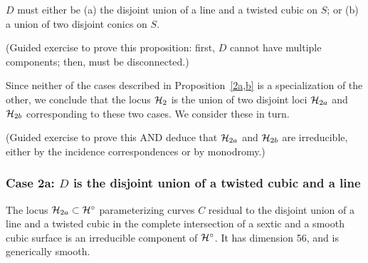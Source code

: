 \begin{proposition}\label {2a,b}
$D$ must either be (a) the disjoint union of a line and a twisted cubic on $S$; or (b) a union of two disjoint conics on $S$. 
\end{proposition}

\begin{exercise}\label{character of D}
(Guided exercise to prove this proposition: first, $D$ cannot have multiple components; then, must be disconnected.)
\end{exercise}

Since neither of the cases described in Proposition~\ref{2a,b} is a specialization of the other, we conclude that the locus ${\cal H}_2$ is the union of two disjoint loci ${\cal H}_{2a}$ and ${\cal H}_{2b}$ corresponding to these two cases. We consider these in turn.


\begin{exercise}
(Guided exercise to prove this AND deduce that ${\cal H}_{2a}$ and ${\cal H}_{2b}$ are irreducible, either by the incidence correspondences or by monodromy.)
\end{exercise}


\subsubsection{Case 2a: $D$ is the disjoint union of a twisted cubic and a line}

\begin{proposition}
The locus ${\cal H}_{2a} \subset {\cal H}^\circ$ parameterizing curves $C$ residual to the disjoint union of a line and a twisted cubic  in the complete intersection of a sextic and a smooth cubic surface is an irreducible component of  ${\cal H}^\circ$. It has dimension 56, and is generically smooth.
\end{proposition} 
 
